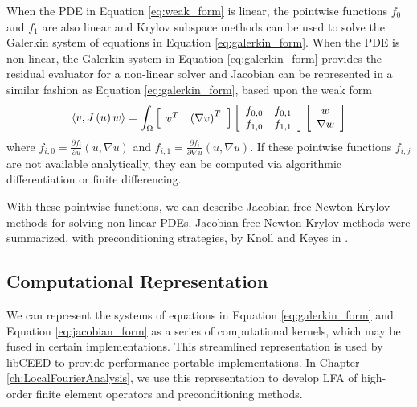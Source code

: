 When the PDE in Equation \ref{eq:weak_form} is linear, the pointwise functions $f_0$ and $f_1$ are also linear and Krylov subspace methods can be used to solve the Galerkin system of equations in Equation \ref{eq:galerkin_form}.
When the PDE is non-linear, the Galerkin system in Equation \ref{eq:galerkin_form} provides the residual evaluator for a non-linear solver and Jacobian can be represented in a similar fashion as Equation \ref{eq:galerkin_form}, based upon the weak form
\begin{equation}
\langle v, J \left( u \right) w \rangle = \int_{\Omega}
\left[ \begin{array}{c c}
v^T & \left( \nabla v \right)^T
\end{array} \right]
\left[ \begin{array}{c c}
f_{0, 0} & f_{0, 1}\\
f_{1, 0} & f_{1, 1}
\end{array} \right]
\left[ \begin{array}{c}
w \\ \nabla w
\end{array} \right]
\label{eq:jacobian_form}
\end{equation}
where $f_{i, 0} = \frac{\partial f_i}{\partial u} \left( u, \nabla u \right)$ and $f_{i, 1} = \frac{\partial f_i}{\partial \nabla u} \left( u, \nabla u \right)$.
If these pointwise functions $f_{i, j}$ are not available analytically, they can be computed via algorithmic differentiation or finite differencing.

With these pointwise functions, we can describe Jacobian-free Newton-Krylov methods for solving non-linear PDEs.
Jacobian-free Newton-Krylov methods were summarized, with preconditioning strategies, by Knoll and Keyes in \cite{knoll2004jacobian}.

\subsection{Computational Representation}

We can represent the systems of equations in Equation \ref{eq:galerkin_form} and Equation \ref{eq:jacobian_form} as a series of computational kernels, which may be fused in certain implementations.
This streamlined representation is used by libCEED \cite{libceed-user-manual} to provide performance portable implementations.
In Chapter \ref{ch:LocalFourierAnalysis}, we use this representation to develop LFA of high-order finite element operators and preconditioning methods.

